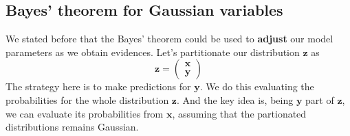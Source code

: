
\subsection{Bayes' theorem for Gaussian variables}

\begin{frame}{\insertsubsection}

We stated before that the Bayes' theorem could be used to \textbf{adjust} our model parameters as we obtain evidences. Let's partitionate our distribution $\mathbf{z}$ as 
\begin{equation*}
\mathbf{z} = \begin{pmatrix}
\mathbf{x} \\
\mathbf{y}
\end{pmatrix}
\end{equation*}
The strategy here is to make predictions for $\mathbf{y}$. We do this evaluating the probabilities for the whole distribution $\mathbf{z}$. And the key idea is, being $\mathbf{y}$ part of $\mathbf{z}$, we can evaluate its probabilities from $\mathbf{x}$, assuming that the partionated distributions remains Gaussian.

\end{frame}

\begin{frame}{\insertsubsection}
\end{frame}

